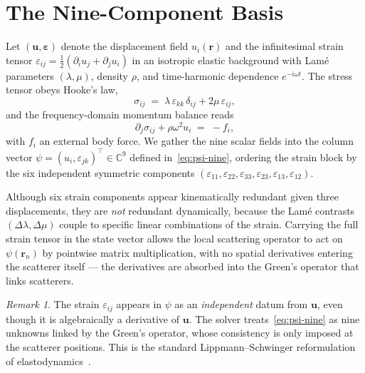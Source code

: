 \documentclass[11pt,a4paper]{article}
\newcommand{\eps}{\varepsilon}
\newcommand{\rrn}{\bm{r}_n}
\newcommand{\uu}{\bm{u}}
\theoremstyle{plain}
\theoremstyle{definition}
\theoremstyle{remark}
\newtheorem{remark}[proposition]{Remark}
\begin{document}
\section{The Nine-Component Basis}\label{sec:basis}
Let $(\uu,\bm{\eps})$ denote the displacement field $u_i(\bm{r})$ and
the infinitesimal strain tensor
$\eps_{ij}=\tfrac{1}{2}(\partial_i u_j+\partial_j u_i)$ in an isotropic
elastic background with Lam\'e parameters $(\lambda,\mu)$, density
$\rho$, and time-harmonic dependence $e^{-i\omega t}$.  The stress
tensor obeys Hooke's law,
\begin{equation}
  \sigma_{ij}
  \;=\;
  \lambda\,\eps_{kk}\,\delta_{ij} + 2\mu\,\eps_{ij},
  \label{eq:hooke}
\end{equation}
and the frequency-domain momentum balance reads
\begin{equation}
  \partial_j\sigma_{ij} + \rho\omega^2 u_i \;=\; -f_i,
  \label{eq:momentum}
\end{equation}
with $f_i$ an external body force.  We gather the nine scalar fields
into the column vector $\psi = (u_i,\eps_{jk})^\top\in\mathbb{C}^9$
defined in~\eqref{eq:psi-nine}, ordering the strain block by the six
independent symmetric components
$(\eps_{11},\eps_{22},\eps_{33},\eps_{23},\eps_{13},\eps_{12})$.

Although six strain components appear kinematically redundant given three
displacements, they are \emph{not} redundant dynamically, because the
Lam\'e contrasts $(\Delta\lambda,\Delta\mu)$ couple to specific linear
combinations of the strain.  Carrying the full strain tensor in the
state vector allows the local scattering operator to act on
$\psi(\rrn)$ by pointwise matrix multiplication, with no spatial
derivatives entering the scatterer itself --- the derivatives are
absorbed into the Green's operator that links scatterers.

\begin{remark}
The strain $\eps_{ij}$ appears in $\psi$ as an \emph{independent} datum
from $\uu$, even though it is algebraically a derivative of $\uu$.  The
solver treats~\eqref{eq:psi-nine} as nine unknowns linked by the
Green's operator, whose consistency is only imposed at the scatterer
positions.  This is the standard Lippmann--Schwinger
reformulation of elastodynamics~\cite{martin2006,kennett2001}.
\end{remark}
\end{document}
